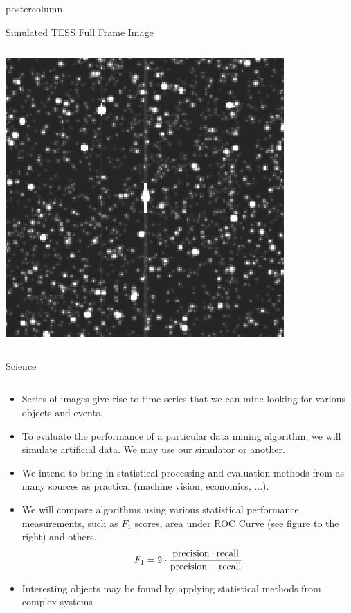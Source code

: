 \documentclass[final,hyperref={pdfpagelabels=false}]{beamer}
\begin{document}
\begin{frame}
\begin{columns}
\begin{column}{.49\textwidth}
\begin{beamercolorbox}[center,wd=\textwidth]{postercolumn}
\begin{minipage}[T]{.95\textwidth}
{\begin{block}{Simulated TESS Full Frame Image}
\begin{columns}
\begin{column}{.28\textwidth}
                  \includegraphics[width=0.80\linewidth]{figures/ffi_simulation.jpg}
		\end{column}
	       \end{columns}
            \end{block}
            \vspace{1cm}
            \begin{block}{Science}
            	\begin{columns}
	                	\begin{column}{.70\textwidth}
		            	\begin{itemize}
					\item Series of images give rise to time series that we can mine looking for various objects and events.
					\item To evaluate the performance of a particular data mining algorithm, we will simulate artificial data. We may use our simulator or another.
					\item We intend to bring in statistical processing and evaluation methods from as many sources as practical (machine vision, economics, ...).
					\item We will compare algorithms using various statistical performance measurements, such as $F_1$ scores, area under ROC Curve (see figure to the right) and others.
					$$ F_1 = 2 \cdot \frac{\textup{precision} \cdot \textup{recall}}{\textup{precision} + \textup{recall}} $$
					\item Interesting objects may be found by applying statistical methods from complex systems

\end{itemize}
\end{column}
\end{columns}
\end{block}}
\end{minipage}
\end{beamercolorbox}
\end{column}
\end{columns}
\end{frame}
\end{document}
